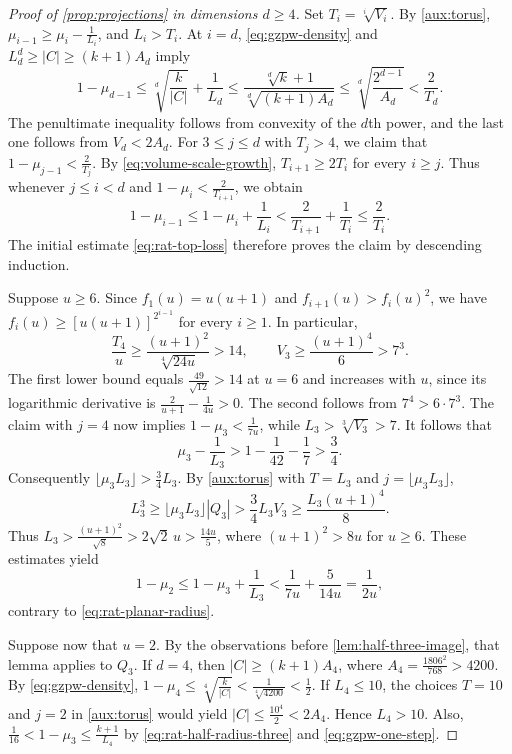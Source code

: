 \documentclass[reqno, 11pt]{article}
\numberwithin{equation}{section}
\theoremstyle{definition}
\begin{document}
\begin{proof}[Proof of \cref{prop:projections} in dimensions $d\ge4$]
Set $T_i=\sqrt[i]{V_i}$. By \cref{aux:torus},
$\mu_{i-1}\ge\mu_i-\frac{1}{L_i}$, and $L_i>T_i$.
At $i=d$, \eqref{eq:gzpw-density} and $L_d^d\ge|C|\ge(k+1)A_d$ imply
\begin{equation}\label{eq:rat-top-loss}
 1-\mu_{d-1}\le \sqrt[d]{\frac{k}{|C|}}+\frac{1}{L_d}
 \le\frac{\sqrt[d]{k}+1}{\sqrt[d]{(k+1)A_d}}
 \le\sqrt[d]{\frac{2^{d-1}}{A_d}}<\frac{2}{T_d}.
\end{equation}
The penultimate inequality follows from convexity of the $d$th power,
and the last one follows from $V_d<2A_d$. For $3\le j\le d$ with $T_j>4$,
we claim that $1-\mu_{j-1}<\frac{2}{T_j}$. By
\eqref{eq:volume-scale-growth}, $T_{i+1}\ge2T_i$ for every $i\ge j$.
Thus whenever $j\le i<d$ and $1-\mu_i<\frac{2}{T_{i+1}}$, we obtain
\[
 1-\mu_{i-1}\le1-\mu_i+\frac{1}{L_i}
 <\frac{2}{T_{i+1}}+\frac{1}{T_i}\le\frac{2}{T_i}.
\]
The initial estimate \eqref{eq:rat-top-loss} therefore proves the claim by descending induction.

Suppose $u\ge6$. Since $f_1(u)=u(u+1)$ and $f_{i+1}(u)>f_i(u)^2$,
we have $f_i(u)\ge[u(u+1)]^{2^{i-1}}$ for every $i\ge1$. In particular,
\[
 \frac{T_4}{u}\ge\frac{(u+1)^2}{\sqrt[4]{24u}}>14,\qquad
 V_3\ge\frac{(u+1)^4}{6}>7^3 .
\]
The first lower bound equals $\frac{49}{\sqrt{12}}>14$ at $u=6$ and
increases with $u$, since its logarithmic derivative is
$\frac{2}{u+1}-\frac{1}{4u}>0$. The second follows from
$7^4>6\cdot7^3$. The claim with $j=4$ now implies
$1-\mu_3<\frac{1}{7u}$, while $L_3>\sqrt[3]{V_3}>7$. It follows that
\[
 \mu_3-\frac{1}{L_3}>1-\frac{1}{42}-\frac{1}{7}>\frac{3}{4}.
\]
Consequently $\lfloor\mu_3 L_3\rfloor>\frac{3}{4}L_3$. By
\cref{aux:torus} with $T=L_3$ and $j=\lfloor\mu_3 L_3\rfloor$,
\[
 L_3^3\ge\lfloor\mu_3 L_3\rfloor |Q_3|>
             \frac{3}{4}L_3 V_3\ge \frac{L_3(u+1)^4}{8}.
\]
Thus $L_3>\frac{(u+1)^2}{\sqrt{8}}>2\sqrt{2}\,u>\frac{14u}{5}$,
where $(u+1)^2>8u$ for $u\ge6$. These estimates yield
\[
 1-\mu_2\le1-\mu_3+\frac{1}{L_3}<
         \frac{1}{7u}+\frac{5}{14u}=\frac{1}{2u},
\]
contrary to \eqref{eq:rat-planar-radius}.

Suppose now that $u=2$. By the observations before
\cref{lem:half-three-image}, that lemma applies to $Q_3$.
If $d=4$, then $|C|\ge(k+1)A_4$, where $A_4=\frac{1806^2}{768}>4200$.
By \eqref{eq:gzpw-density}, $1-\mu_4\le\sqrt[4]{\frac{k}{|C|}}
<\frac{1}{\sqrt[4]{4200}}<\frac{1}{2}$. If $L_4\le10$, the choices
$T=10$ and $j=2$ in \cref{aux:torus} would yield
$|C|\le\frac{10^4}{2}<2A_4$. Hence $L_4>10$. Also,
$\frac{1}{16}<1-\mu_3\le\frac{k+1}{L_4}$ by
\eqref{eq:rat-half-radius-three} and \eqref{eq:gzpw-one-step}.


\end{proof}
\end{document}
